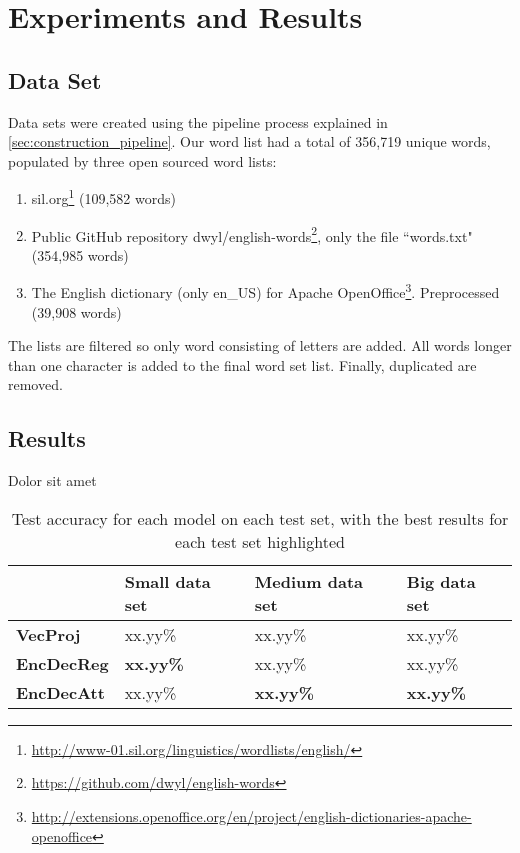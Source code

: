 
\chapter{Experiments and Results}
\label{ch:experiments_and_results}

\section{Data Set}
Data sets were created using the pipeline process explained in \ref{sec:construction_pipeline}. Our word list had a total of 356,719 unique words, populated by three open sourced word lists:

\begin{enumerate}
    \item sil.org\footnote{\url{http://www-01.sil.org/linguistics/wordlists/english/}} (109,582 words)
    \item Public GitHub repository dwyl/english-words\footnote{\url{https://github.com/dwyl/english-words}}, only the file ``words.txt" (354,985 words) 
    \item The English dictionary (only en\_US) for Apache OpenOffice\footnote{\url{http://extensions.openoffice.org/en/project/english-dictionaries-apache-openoffice}}. Preprocessed (39,908 words)
\end{enumerate}

The lists are filtered so only word consisting of letters are added. All words longer than one character is added to the final word set list. Finally, duplicated are removed.


\section{Results}
Dolor sit amet

\begin{table}[H]
    \centering
    \begin{tabular}{|l|l|l|l|}
        \hline 
                                           & \textbf{Small data set}         & \textbf{Medium data set}        & \textbf{Big data set}           \\ \hline
        \textbf{VecProj}                   & xx.yy\%                         & xx.yy\%                         & xx.yy\%                         \\ \hline
        \textbf{EncDecReg}                 & \textbf{xx.yy\%}                & xx.yy\%                         & xx.yy\%                         \\ \hline
        \textbf{EncDecAtt}                 & xx.yy\%                         & \textbf{xx.yy\%}                & \textbf{xx.yy\%}                \\ \hline
    \end{tabular}
    \caption{Test accuracy for each model on each test set, with the best results for each test set highlighted}
    \label{table:accuracy_model_data_sets}
\end{table}